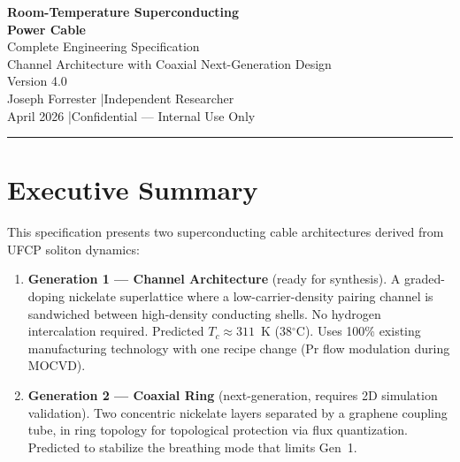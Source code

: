 \documentclass[11pt, a4paper]{article}
\begin{document}
\begin{center}
  {\LARGE \textbf{Room-Temperature Superconducting}}\\[4pt]
  {\LARGE \textbf{Power Cable}}\\[6pt]
  {\large Complete Engineering Specification}\\[4pt]
  {\large Channel Architecture with Coaxial Next-Generation Design}\\[10pt]
  {\color{nm-gray}\small Version 4.0}\\[4pt]
  {\color{nm-gray}\small Joseph Forrester \quad|\quad Independent Researcher}\\[4pt]
  {\color{nm-gray}\small April 2026 \quad|\quad Confidential --- Internal Use Only}
\end{center}

\vspace{1em}\hrule\vspace{1em}

\section*{Executive Summary}

This specification presents two superconducting cable architectures
derived from UFCP soliton dynamics:

\begin{enumerate}
  \item \textbf{Generation 1 --- Channel Architecture} (ready for
        synthesis). A graded-doping nickelate superlattice where a
        low-carrier-density pairing channel is sandwiched between
        high-density conducting shells. No hydrogen intercalation
        required. Predicted $T_c \approx 311$~K (38$^\circ$C).
        Uses 100\% existing manufacturing technology with one recipe
        change (Pr flow modulation during MOCVD).

  \item \textbf{Generation 2 --- Coaxial Ring} (next-generation,
        requires 2D simulation validation). Two concentric nickelate
        layers separated by a graphene coupling tube, in ring
        topology for topological protection via flux quantization.
        Predicted to stabilize the breathing mode that limits Gen~1.
\end{enumerate}
\end{document}
